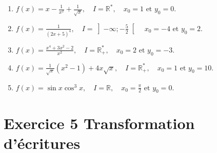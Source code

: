 \documentclass[12pt]{article}
\begin{document}
\begin{enumerate}
    \item $f(x) = x - \frac{1}{x^2} + \frac{1}{\sqrt{x}}, \quad I = \mathbb{R}^*, \quad x_0 = 1 \text{ et } y_0 = 0.$
    
    \item $f(x) = \frac{1}{(2x+5)^4}, \quad I = \left]-\infty; -\frac{5}{2}\right[ \quad x_0 = -4 \text{ et } y_0 = 2.$
    
    \item $f(x) = \frac{x^4 + 3x^2 - 2}{x^{2}}, \quad I = \mathbb{R}_+^{*}, \quad x_0 = 2 \text{ et } y_0 = -3.$
    
    \item $f(x) = \frac{1}{\sqrt{x}} (x^2 - 1) + 4x\sqrt{x}, \quad I = \mathbb{R}_+^{*}, \quad x_0 = 1 \text{ et } y_0 = 10.$
    
    \item $f(x) = \sin x \cos^3 x, \quad I = \mathbb{R}, \quad x_0 = \frac{\pi}{2} \text{ et } y_0 = 0.$
\end{enumerate}
\section*{Exercice 5 \quad Transformation d’écritures}
\end{document}
